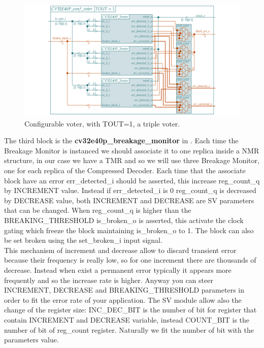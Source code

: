 {	    \begin{figure}[H]
    		\centering
    		\includegraphics[width=1.3\textwidth,center]{./images/cv32e40p_conf_voter_tout1.png}
    		\caption{Configurable voter, with TOUT=1, a triple voter.}
    		\label{fig:cv32e40p_conf_voter_tout1}
    	\end{figure} 	
	
	
	    The third block is the \textbf{cv32e40p\_breakage\_monitor} in . 
	    Each time the  Breakage Monitor is instanced we should associate it to one replica inside a NMR structure, in our case we have a TMR and so we will use three Breakage Monitor, one for each replica of the Compressed Decoder.
	    Each time that the associate block have an error err\_detected\_i should be asserted, this increase reg\_count\_q by INCREMENT value.
	    Instead if err\_detected\_i is 0 reg\_count\_q is decreased by DECREASE value, both INCREMENT and DECREASE are SV parameters that can be changed.
	    When reg\_count\_q is higher than the  BREAKING\_THRESHOLD is\_broken\_o is asserted, this activate the clock gating which freeze the block maintaining is\_broken\_o to 1. The block can also be set broken using the set\_broken\_i input signal.\\
	    
	    This mechanism of increment and decrease allow to discard transient error because their frequency is really low, so for one increment there are thousands of decrease. 
	    Instead when exist a permanent error typically it appears more frequently and so the increase rate is higher.
	    Anyway you can steer INCREMENT, DECREASE and BREAKING\_THRESHOLD parameters in order to fit the error rate of your application. 
	    The SV module allow also the change of the register size: INC\_DEC\_BIT is the number of bit for register that contain INCREMENT and DECREASE variable, instead COUNT\_BIT is the number of bit of reg\_count register.
	    Naturally we fit the number of bit with the parameters value.\\
	    
}
